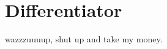 \documentclass{article}
\begin{document}
\section{Differentiator}
wazzzuuuup, shut up and take my money.\newline 
\end{document}
